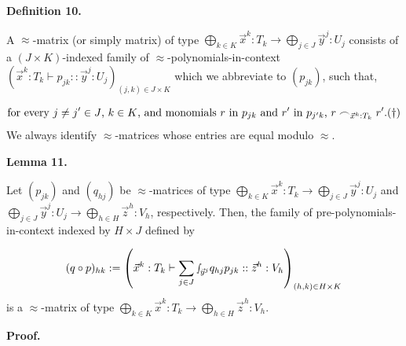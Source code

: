  
 
 
\par\medskip\noindent\textbf{Definition 10.}\par
 
 
A $\approx$-matrix (or simply matrix) of type $\bigoplus_{k\in K}\vec{x}^{k}:T_{k}\to\bigoplus_{j\in J}\vec{y}^{j}:U_{j}$ consists of a $(J\times K)$-indexed family of $\approx$-polynomials-in-context $\left(\vec{x}^{k}:T_{k}\vdash p_{jk}::\vec{y}^{j}:U_{j}\right)_{(j,k)\in J%
\times K}$ which we abbreviate to $(p_{jk})$, such that,\par
    \[\text{for every $j\neq j^{\prime}\in J$, $k\in K$, and monomials $r$ in $p_{jk%
}$ and $r^{\prime}$ in $p_{j^{\prime}k}$, $r\frown_{\vec{x}^{k}:T_{k}}r^{%
\prime}$.}\hfill({\dagger})\]    
We always identify $\approx$-matrices whose entries are equal modulo $\approx$.\par
 
 
 
 
\par\medskip\noindent\textbf{Lemma 11.}\par
 
 
Let $(p_{jk})$ and $(q_{hj})$ be $\approx$-matrices of type $\bigoplus_{k\in K}\vec{x}^{k}:T_{k}\to\bigoplus_{j\in J}\vec{y}^{j}:U_{j}$ and $\bigoplus_{j\in J}\vec{y}^{j}:U_{j}\to\bigoplus_{h\in H}\vec{z}^{h}:V_{h}$, respectively. Then, the family of pre-polynomials-in-context indexed by $H\times J$ defined by\par
    \[(q\circ p)_{hk}:=\left(\vec{x}^{k}:T_{k}\vdash\sum_{j\in J}{\smallint\!}_{\vec%
{y}^{j}}q_{hj}p_{jk}::\vec{z}^{h}:V_{h}\right)_{(h,k)\in H\times K}\]    
is a $\approx$-matrix of type $\bigoplus_{k\in K}\vec{x}^{k}:T_{k}\to\bigoplus_{h\in H}\vec{z}^{h}:V_{h}$.\par
 
 
 
 
 
\par\medskip\noindent\textbf{Proof.}\par
 
